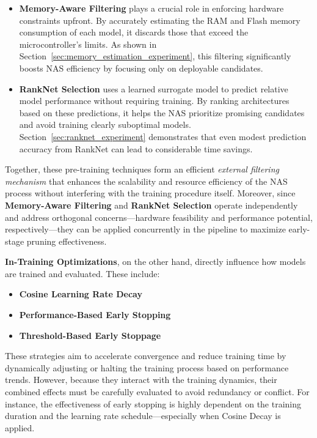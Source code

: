 \begin{itemize}
    \item \textbf{Memory-Aware Filtering} plays a crucial role in enforcing hardware constraints upfront. By accurately estimating the RAM and Flash memory consumption of each model, it discards those that exceed the microcontroller's limits. As shown in Section~\ref{sec:memory_estimation_experiment}, this filtering significantly boosts NAS efficiency by focusing only on deployable candidates.

    \item \textbf{RankNet Selection} uses a learned surrogate model to predict relative model performance without requiring training. By ranking architectures based on these predictions, it helps the NAS prioritize promising candidates and avoid training clearly suboptimal models. Section~\ref{sec:ranknet_experiment} demonstrates that even modest prediction accuracy from RankNet can lead to considerable time savings.
\end{itemize}

Together, these pre-training techniques form an efficient \emph{external filtering mechanism} that enhances the scalability and resource efficiency of the NAS process without interfering with the training procedure itself. Moreover, since \textbf{Memory-Aware Filtering} and \textbf{RankNet Selection} operate independently and address orthogonal concerns—hardware feasibility and performance potential, respectively—they can be applied concurrently in the pipeline to maximize early-stage pruning effectiveness.


\textbf{In-Training Optimizations}, on the other hand, directly influence how models are trained and evaluated. These include:

\begin{itemize}
    \item \textbf{Cosine Learning Rate Decay}
    \item \textbf{Performance-Based Early Stopping}
    \item \textbf{Threshold-Based Early Stoppage}
\end{itemize}

These strategies aim to accelerate convergence and reduce training time by dynamically adjusting or halting the training process based on performance trends. However, because they interact with the training dynamics, their combined effects must be carefully evaluated to avoid redundancy or conflict. For instance, the effectiveness of early stopping is highly dependent on the training duration and the learning rate schedule—especially when Cosine Decay is applied.

